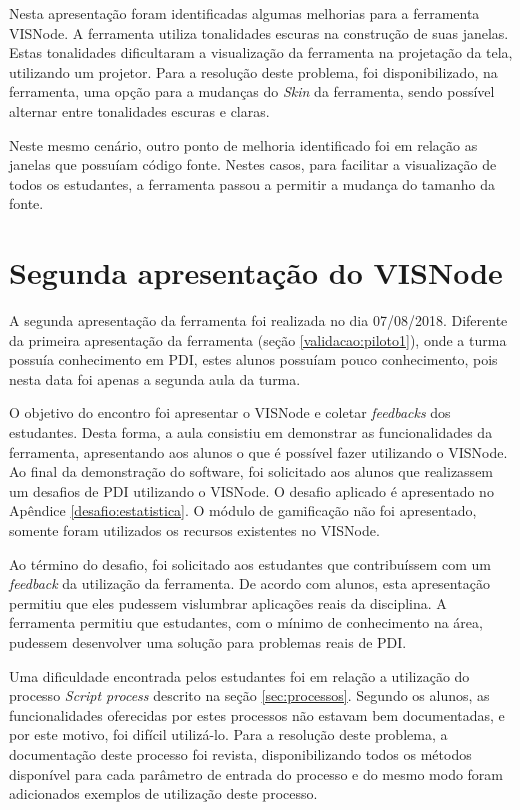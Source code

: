 \documentclass[
	12pt,				%
	oneside,			%
	a4paper,			%
	english,			%
	french,				%
	spanish,			%
	brazil,				%
	]{abntex2}
\begin{document}
Nesta apresentação foram identificadas algumas melhorias para a ferramenta VISNode. A ferramenta utiliza tonalidades escuras na construção de suas janelas. Estas tonalidades dificultaram a visualização da ferramenta na projetação da tela, utilizando um projetor. Para a resolução deste problema, foi disponibilizado, na ferramenta, uma opção para a mudanças do \textit{Skin} da ferramenta, sendo possível alternar entre tonalidades escuras e claras.

Neste mesmo cenário, outro ponto de melhoria identificado foi em relação as janelas que possuíam código fonte. Nestes casos, para facilitar a visualização de todos os estudantes, a ferramenta  passou a permitir a mudança do tamanho da fonte.

\section{Segunda apresentação do VISNode}

A segunda apresentação da ferramenta foi realizada no dia 07/08/2018. Diferente da primeira apresentação da ferramenta (seção \ref{validacao:piloto1}), onde a turma possuía conhecimento em PDI, estes alunos possuíam pouco conhecimento, pois nesta data foi apenas a segunda aula da turma. 

O objetivo do encontro foi apresentar o VISNode e coletar \textit{feedbacks} dos estudantes. Desta forma, a aula consistiu em demonstrar as funcionalidades da ferramenta, apresentando aos alunos o que é possível fazer utilizando o VISNode. Ao final da demonstração do software, foi solicitado aos alunos que realizassem um desafios de PDI utilizando o VISNode. O desafio aplicado é apresentado no Apêndice \ref{desafio:estatistica}. O módulo de gamificação não foi apresentado, somente foram utilizados os recursos existentes no VISNode.

Ao término do desafio, foi solicitado aos estudantes que contribuíssem com um \textit{feedback} da utilização da ferramenta. De acordo com alunos, esta apresentação permitiu que eles pudessem vislumbrar aplicações reais da disciplina. A ferramenta permitiu que estudantes, com o mínimo de conhecimento na área, pudessem desenvolver uma solução para problemas reais de PDI.

Uma dificuldade encontrada pelos estudantes foi em relação a utilização do processo \textit{Script process} descrito na seção \ref{sec:processos}. Segundo os alunos, as funcionalidades oferecidas por estes processos não estavam bem documentadas, e por este motivo, foi difícil utilizá-lo. Para a resolução deste problema, a documentação deste processo foi revista, disponibilizando todos os métodos disponível para cada parâmetro de entrada do processo e do mesmo modo foram adicionados exemplos de utilização deste processo.
\end{document}
